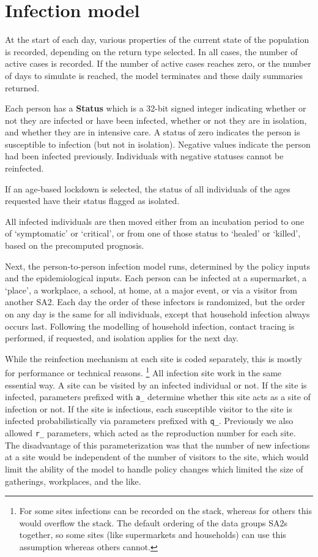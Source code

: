 \documentclass{grattan}
\newcommand*{\code}[1]{\texttt{#1}}
\begin{document}
\section{Infection model}

At the start of each day, various properties of the current state of the population is recorded,
depending on the return type selected. In all cases, the number of active cases is recorded.
If the number of active cases reaches zero, or the number of days to simulate is reached, the model
 terminates and these daily summaries returned.

Each person has a \textbf{Status} which is a 32-bit signed integer indicating whether or not
they are infected or have been infected, whether or not they are in isolation, and whether they are
in intensive care. A status of zero indicates the person is susceptible to infection (but not
in isolation). Negative values indicate the person had been infected previously. Individuals with
negative statuses cannot be reinfected.


If an age-based lockdown is selected, the status of  all individuals of the ages requested have their
status flagged as isolated.

All infected individuals are then moved either from an incubation period to one of
`symptomatic' or `critical', or from one of those status to `healed' or `killed', based
on the precomputed prognosis.

Next, the person-to-person infection model runs, determined by the policy inputs and
the epidemiological inputs. Each person can be infected at a supermarket, a `place',
a workplace, a school, at home, at a major event, or via a visitor from another SA2. Each day
the order of these infectors is randomized, but the order on any day is the same for
all individuals, except that household infection always
occurs last. Following the modelling of household infection, contact tracing is performed,
if requested, and isolation applies for the next day.

While the reinfection mechanism at each site is coded separately, this is mostly for
performance or technical reasons.%
	\footnote{For some sites infections can be recorded on the stack, whereas for others this would
	overflow the stack. The default ordering of the data groups SA2s together, so some sites
	(like supermarkets and households) can use this assumption whereas others cannot.}
All infection site work in the same essential way. A site can be visited by an infected
individual or not. If the site is infected, parameters prefixed with \code{a\_} determine
whether this site acts as a site of infection or not. If the site is infectious,
each susceptible visitor to the site is infected probabilistically
via parameters prefixed with \code{q\_}.
Previously we also allowed \code{r\_} parameters, which acted as the reproduction number for
each site. The disadvantage of this parameterization was that the number of new
infections at a site would be independent of the number of visitors to the site, which would limit
the ability of the model to handle policy changes which limited the size of gatherings, workplaces,
and the like.
\end{document}
